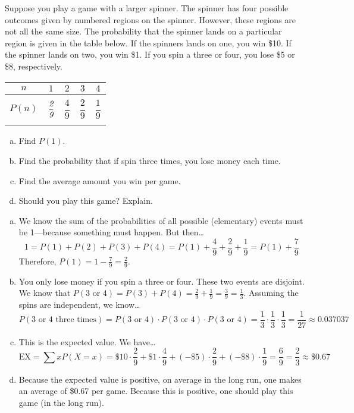 \documentclass[11pt,letterpaper]{article}
\begin{document}

 Suppose you play a game with a larger spinner. The spinner has four possible outcomes given by numbered regions on the spinner. However, these regions are not all the same size. The probability that the spinner lands on a particular region is given in the table below. If the spinners lands on one, you win \$10. If the spinner lands on two, you win \$1. If you spin a three or four, you lose \$5 or \$8, respectively. 
	\begin{table}[!ht]
	\centering 
	\begin{tabular}{|c||c|c|c|c|} \hline 
	$n$ & $1$ & $2$ & $3$ & $4$ \\ \hline 
	$P(n)$ & $\dfrac{\textit{2}\rule{0pt}{2.9ex}}{\textit{9}\rule[-1.3ex]{0pt}{0pt}}$ & $\dfrac{4}{9}$ & $\dfrac{2}{9}$ & $\dfrac{1}{9}$ \\ \hline
	\end{tabular}
	\end{table}

\begin{enumerate}[(a)]
\item Find $P(1)$.
\item Find the probability that if spin three times, you lose money each time. 
\item Find the average amount you win per game.
\item Should you play this game? Explain. 
\end{enumerate} \pspace

\sol 
\begin{enumerate}[(a)]
\item We know the sum of the probabilities of all possible (elementary) events must be 1---because something must happen. But then\dots
	\[
	1= P(1) + P(2) + P(3) + P(4)= P(1) + \dfrac{4}{9} + \dfrac{2}{9} + \dfrac{1}{9}= P(1) + \dfrac{7}{9}
	\]
Therefore, $P(1)= 1 - \frac{7}{9}= \frac{2}{9}$. \pspace 

\item You only lose money if you spin a three or four. These two events are disjoint. We know that $P(3 \text{ or } 4)= P(3) + P(4)= \frac{2}{9} + \frac{1}{9}= \frac{3}{9}= \frac{1}{3}$. Assuming the spins are independent, we know\dots
	\[
	P(\text{3 or 4 three times})= P(3 \text{ or } 4) \cdot P(3 \text{ or } 4) \cdot P(3 \text{ or } 4)= \dfrac{1}{3} \cdot \dfrac{1}{3} \cdot \dfrac{1}{3}= \dfrac{1}{27} \approx 0.037037
	\] \pspace

\item This is the expected value. We have\dots
	\[
	\text{EX}= \sum x P(X= x)= \$10 \cdot \dfrac{2}{9} + \$1 \cdot \dfrac{4}{9} + (-\$5) \cdot \dfrac{2}{9} + (-\$8) \cdot \dfrac{1}{9}= \dfrac{6}{9}= \dfrac{2}{3} \approx \$0.67
	\] \pspace

\item Because the expected value is positive, on average in the long run, one makes an average of \$0.67 per game. Because this is positive, one should play this game (in the long run). 
\end{enumerate}
\end{document}
